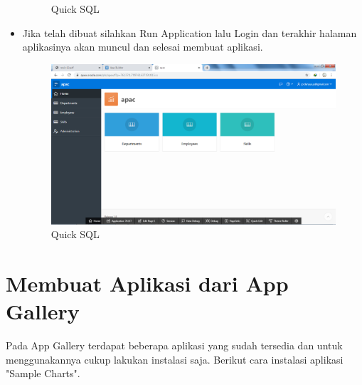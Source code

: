 \documentclass[12pt, times new roman]{article}
\begin{document}
\begin{itemize}
\begin{figure}[!htpb]
	\caption{Quick SQL}
\end{figure}
\item Jika telah dibuat silahkan Run Application lalu Login dan terakhir halaman aplikasinya akan muncul dan selesai membuat aplikasi.
\begin{figure}[!htpb]
	\centering
	\includegraphics[width=12cm]{figures/Screenshot_23.png}
	\caption{Quick SQL}
\end{figure}
\end{itemize}
\section{Membuat Aplikasi dari App Gallery}
Pada App Gallery terdapat beberapa aplikasi yang sudah tersedia dan untuk menggunakannya cukup lakukan instalasi saja. Berikut cara instalasi aplikasi "Sample Charts".
\end{document}
